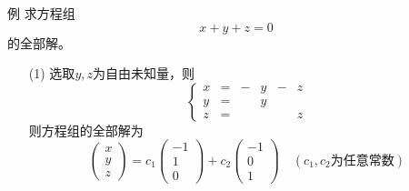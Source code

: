 \begin{frame}
  \begin{footnotesize}
    \begin{exampleblock}{例}
      求方程组
      $$
      x+y+z=0
      $$
      的全部解。
    \end{exampleblock}
    \pause
    \jiename
    \begin{itemize}
    \item[(1)] 选取$y,z$为自由未知量，则
      $$
      \left\{
      \begin{array}{cccccc}
        x&=&-&y&-&z\\
        y&=&&y&&\\
        z&=&&&&z
      \end{array}
      \right.
      $$
      则方程组的全部解为
      $$
      \left(
      \begin{array}{r}
        x\\y\\z
      \end{array}
      \right) = c_1      \left(
      \begin{array}{r}
        -1\\1\\0
      \end{array}
      \right) + c_2      \left(
      \begin{array}{r}
        -1\\0\\1
      \end{array}
      \right) \quad (c_1,c_2\mbox{为任意常数})
      $$
    \end{itemize}
  \end{footnotesize}
\end{frame}

